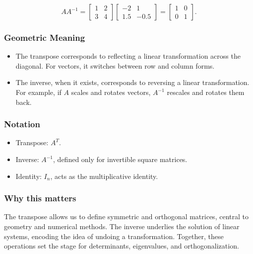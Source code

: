 \documentclass[
  12pt,
  a4paper,
]{article}
\begin{document}
\[AA^{-1} = \begin{bmatrix}
1 & 2 \\
3 & 4
\end{bmatrix}
\begin{bmatrix}
-2 & 1 \\
1.5 & -0.5
\end{bmatrix}
=
\begin{bmatrix}
1 & 0 \\
0 & 1
\end{bmatrix}.\]

\subsubsection{Geometric Meaning}\label{geometric-meaning-2}

\begin{itemize}
\item
  The transpose corresponds to reflecting a linear transformation across
  the diagonal. For vectors, it switches between row and column forms.
\item
  The inverse, when it exists, corresponds to reversing a linear
  transformation. For example, if \(A\) scales and rotates vectors,
  \(A^{-1}\) rescales and rotates them back.
\end{itemize}

\subsubsection{Notation}\label{notation-6}

\begin{itemize}
\item
  Transpose: \(A^T\).
\item
  Inverse: \(A^{-1}\), defined only for invertible square matrices.
\item
  Identity: \(I_n\), acts as the multiplicative identity.
\end{itemize}

\subsubsection{Why this matters}\label{why-this-matters-6}

The transpose allows us to define symmetric and orthogonal matrices,
central to geometry and numerical methods. The inverse underlies the
solution of linear systems, encoding the idea of undoing a
transformation. Together, these operations set the stage for
determinants, eigenvalues, and orthogonalization.
\end{document}
